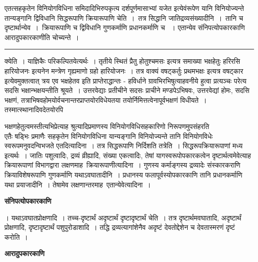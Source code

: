 \documentclass[11pt, openany]{book}
\newcommand\alfootnote[1]{%
  \begingroup
  \renewcommand\thefootnoteA{}\footnoteA{#1}%
  \addtocounter{footnoteA}{-1}%
  \endgroup
}
\begin{document}
{\bl एतत्सहकृतेन विनियोगविधिना समिदादिभिरुपकृत्य {\qtl दर्शपूर्णमासाभ्यां यजेत} इत्येवंरूपेण यानि विनियोज्यन्ते तान्यङ्गानि द्विविधानि {\qtl सिद्धरूपाणि
क्रियारूपाणि चेति~}।~तत्र {\qtl सिद्धानि जातिद्रव्यसंख्यादीनि~}।~तानि च दृष्टार्थान्येव~।~क्रियारूपाणि च द्विविधानि {\qtl गुणकर्माणि प्रधानकर्माणि च} ~। एतान्येव संनिपत्योपकारकाणि आरादुपकारकाणीति चोच्यन्ते~।\\}
\hrule
\vspace{3mm}
\noindent
{\br क्येति~।} याज्ञिकैः परिकल्पितयेत्यर्थः~। {\br तृतीये} स्थितं {\qt प्रैतु  होतुश्चमसः} इत्यत्र समाख्या भक्षहेतुः {\qt हरिरसि हारियोजनः} इत्यनेन मन्त्रेण गृह्यमाणो ग्रहो हारियोजनः~। तत्र वाक्यं {\qt वषट्कर्तुः प्रथमभक्षः} इत्यत्र वषट्कार इत्येवमुक्तत्वात् त्रय एव भक्षहेतव इति प्राप्तेराद्धान्तः - हविर्धाने ग्रावभिरभिषुत्याहवनीये हुत्वा प्रत्यञ्चः परेत्य सदसि भक्षान्भक्षयन्तीति श्रूयते~। उत्तरवेद्याः प्रतीचीने सदसः प्राचीने मण्डपेऽभिषवः, उत्तरवेद्यां होमः, सदसि भक्षणं, तत्राभिषवहोमयोर्वचनान्तरप्राप्तयोरविधेयतया तयोर्निमित्तत्वेनापूर्वभक्षणं विधीयते~। तस्मात्स्थानादिवदेतयोरपि\alfootnote{टिप्प०\textemdash\ $^{1}$अभिषवहोमयोरित्यर्थः~।}\footnotemarkA[1]
भक्षणहेतुत्वमस्तीत्यभिप्रेत्याह श्रुत्यादिप्रमाणस्य विनियोगविधिसहकारिणो निरूपणमुपसंहरति\\

 एतैः षड्भिः प्रमाणैः सहकृतेन विनियोगविधिना यान्यङ्गानि विनियोज्यन्ते तानि विनियोगविधेः स्वरूपमनुवदन्विभजते {\br एतदित्यादिना~।} तत्र सिद्धरूपाणि निर्दिशति  {\br तत्रेति~।} सिद्धरूपक्रियारूपाणां मध्य इत्यर्थः~। जातिः पशुत्वादिः, द्रव्यं व्रीह्यादि, संख्या एकत्वादिः, तेषां यागस्वरूपोपकारकत्वेन दृष्टार्थत्वमेवेत्याह क्रियारूपाणां विभागद्वारा लक्षणमाह\textendash\ {\br क्रियारूपाणीत्यादिना~।} गुणस्य कर्माङ्गस्य द्रव्यादेः संस्कारकराणि क्रियाविशेषरूपाणि गुणकर्माणि यथाऽवघातादीनि~। प्रधानस्य फलापूर्वस्योपकारकाणि तानि प्रधानकर्माणि यथा
प्रयाजादीनि~। तेषामेव लक्षणान्तरमाह\textemdash\ {\br एतान्येवेत्यादिना~।}
\newpage
\fancyhead[RE]{[ आरादुप\textemdash\ }
\begin{center}
 \textbf{संनिपत्योपकारकाणि }   
\end{center}
 
{। यथाऽवघातप्रोक्षणादि~। तच्च-{\qtl दृष्टार्थं अदृष्टार्थं दृष्टादृष्टार्थं चेति}~। तत्र दृष्टार्थमवघातादि, अदृष्टार्थं प्रोक्षणादि, दृष्टादृष्टार्थं पशुपुरोडाशादि~। तद्धि द्रव्यत्यागांशेनैव अदृष्टं देवतोद्देशेन च देवतास्मरणं दृष्टं करोति~।~}
\begin{center}
 \textbf{आरादुपकारकाणि }    
\end{center}
\end{document}
